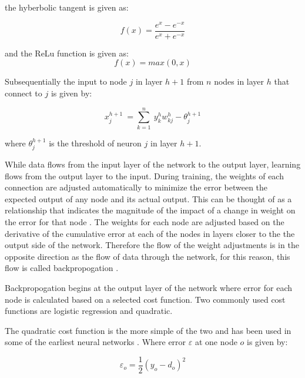 \documentclass{IEEEtran}
\begin{document}
the hyberbolic tangent is given as:

\begin{equation}
\label{eqn_nn_tanh}
f(x) = \frac{e^x - e^{-x}}{e^x + e^{-x}}
\end{equation}

and the ReLu function is given as:
\begin{equation}
\label{eqn_nn_relu}
f(x) = max(0,x)
\end{equation}


Subsequentially the input to node $j$ in layer $h+1$ from $n$ nodes in layer $h$ that connect to $j$ is given by:

\begin{equation}
\label{eqn_nn_allnodeoutput}
x^{h+1}_{j} \ = \sum^n_{k=1} \ y^h_k w^h_{kj} - \theta^{h+1}_j
\end{equation}

where $ \theta^{h+1}_j $ is the threshold of neuron $j$ in layer $h+1$.



While data flows from the input layer of the network to the output layer, learning flows from the output layer to the input. During training, the weights of each connection are adjusted automatically to minimize the error between the expected output of any node and its actual output. This can be thought of as a relationship that indicates the magnitude of the impact of a change in weight on the error for that node \cite{lecun2015deep}. The weights for each node are adjusted based on the derivative of the cumulative error at each of the nodes in layers closer to the the output side of the network. Therefore the flow of the weight adjustments is in the opposite direction as the flow of data through the network, for this reason, this flow is called backpropogation \cite{lecun2015deep}.

Backpropogation begins at the output layer of the network where error for each node is calculated based on a selected cost function. Two commonly used cost functions are logistic regression and quadratic.

The quadratic cost function is the more simple of the two and has been used in some of the earliest neural networks \cite{rumelhart1988learning}. Where error $\varepsilon$ at one node $o$ is given by:

\begin{equation}
\label{eqn_nn_error}
\varepsilon_o = \frac{1}{2} (y_o - d_o)^2
\end{equation}
\end{document}
